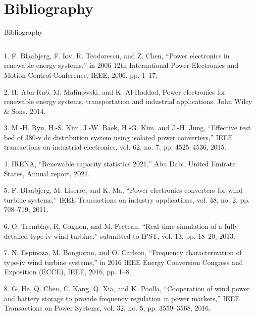 \section{Bibliography}
\begin{frame}{Bibliography}
  \tiny
  \justifying
\begin{columns}
\begin{column}{0.5\textwidth}
  \parbox{1\textwidth}{
  1. F. Blaabjerg, F. Iov, R. Teodorescu, and Z. Chen, “Power electronics in renewable energy systems,” in 2006 12th International Power Electronics and Motion Control Conference, IEEE, 2006, pp. 1–17.
\vspace{0.1cm}

  2. H. Abu-Rub, M. Malinowski, and K. Al-Haddad, Power electronics for renewable energy systems, transportation and industrial applications. John Wiley \& Sons, 2014. 
\vspace{0.1cm}

  3. M.-H. Ryu, H.-S. Kim, J.-W. Baek, H.-G. Kim, and J.-H. Jung, “Effective test bed of 380-v dc distribution system using isolated power converters,” IEEE transactions on industrial electronics, vol. 62, no. 7, pp. 4525–4536, 2015.
  \vspace{0.1cm}

  4. IRENA, “Renewable capacity statistics 2021,” Abu Dabi, United Emirate States, Annual report, 2021.
  \vspace{0.1cm}

  5. F. Blaabjerg, M. Liserre, and K. Ma, “Power electronics converters for wind turbine systems,” IEEE Transactions on industry applications, vol. 48, no. 2, pp. 708–719, 2011.
  \vspace{0.1cm}

  6. O. Tremblay, R. Gagnon, and M. Fecteau, “Real-time simulation of a fully detailed type-iv wind turbine,” submitted to IPST, vol. 13, pp. 18–20, 2013.
  \vspace{0.1cm}

  7. N. Espinoza, M. Bongiorno, and O. Carlson, “Frequency characterization of type-iv wind turbine systems,” in 2016 IEEE Energy Conversion Congress and Exposition (ECCE), IEEE, 2016, pp. 1–8.
  \vspace{0.1cm}

  8. G. He, Q. Chen, C. Kang, Q. Xia, and K. Poolla, “Cooperation of wind power and battery storage to provide frequency regulation in power markets,” IEEE Transactions on Power Systems, vol. 32, no. 5, pp. 3559–3568, 2016.
  \vspace{0.1cm}

}
\end{column}
\end{columns}
\end{frame}
